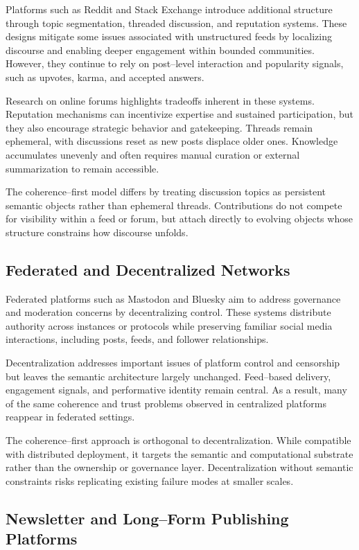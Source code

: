 \documentclass[11pt]{article}
\begin{document}
Platforms such as Reddit and Stack Exchange introduce additional structure through topic
segmentation, threaded discussion, and reputation systems. These designs mitigate some
issues associated with unstructured feeds by localizing discourse and enabling deeper
engagement within bounded communities. However, they continue to rely on post--level
interaction and popularity signals, such as upvotes, karma, and accepted answers.

Research on online forums highlights tradeoffs inherent in these systems. Reputation
mechanisms can incentivize expertise and sustained participation, but they also encourage
strategic behavior and gatekeeping. Threads remain ephemeral, with discussions reset as
new posts displace older ones. Knowledge accumulates unevenly and often requires manual
curation or external summarization to remain accessible.

The coherence--first model differs by treating discussion topics as persistent semantic
objects rather than ephemeral threads. Contributions do not compete for visibility within
a feed or forum, but attach directly to evolving objects whose structure constrains how
discourse unfolds.

\subsection{Federated and Decentralized Networks}

Federated platforms such as Mastodon and Bluesky aim to address governance and moderation
concerns by decentralizing control. These systems distribute authority across instances
or protocols while preserving familiar social media interactions, including posts,
feeds, and follower relationships.

Decentralization addresses important issues of platform control and censorship but leaves
the semantic architecture largely unchanged. Feed--based delivery, engagement signals,
and performative identity remain central. As a result, many of the same coherence and
trust problems observed in centralized platforms reappear in federated settings.

The coherence--first approach is orthogonal to decentralization. While compatible with
distributed deployment, it targets the semantic and computational substrate rather than
the ownership or governance layer. Decentralization without semantic constraints risks
replicating existing failure modes at smaller scales.

\subsection{Newsletter and Long--Form Publishing Platforms}
\end{document}
